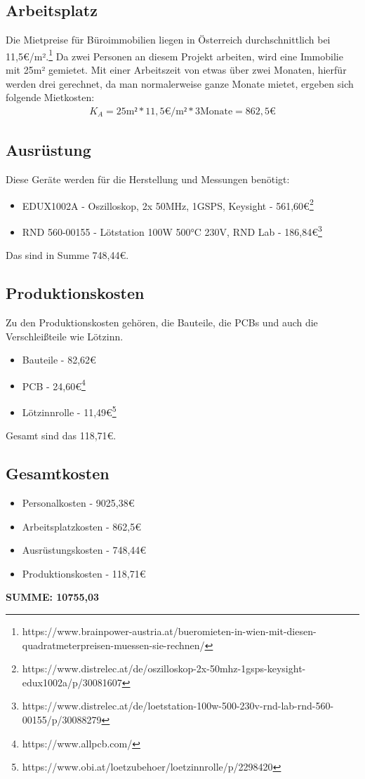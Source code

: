 \documentclass[paper=a4, 12pt]{scrreprt}
\begin{document}
		\subsection{Arbeitsplatz}\hfill \break
		Die Mietpreise für Büroimmobilien liegen in Österreich durchschnittlich bei 11,5€/m².\footnote{https://www.brainpower-austria.at/bueromieten-in-wien-mit-diesen-quadratmeterpreisen-muessen-sie-rechnen/} Da zwei Personen an diesem Projekt arbeiten, wird eine Immobilie mit 25m² gemietet. Mit einer Arbeitszeit von etwas über zwei Monaten, hierfür werden drei gerechnet, da man normalerweise ganze Monate mietet, ergeben sich folgende Mietkosten:
		\begin{align*} 
		K_{ A } = 25\text{m²} * 11,5\text{€/m²} * 3\text{Monate} = 862,5\text{€}
		\end{align*} 
		\subsection{Ausrüstung}\hfill \break
		Diese Geräte werden für die Herstellung und Messungen benötigt:
		\begin{itemize}
			\item EDUX1002A - Oszilloskop, 2x 50MHz, 1GSPS, Keysight - 561,60€\footnote{https://www.distrelec.at/de/oszilloskop-2x-50mhz-1gsps-keysight-edux1002a/p/30081607}
			\item RND 560-00155 - Lötstation 100W 500°C 230V, RND Lab - 186,84€\footnote{https://www.distrelec.at/de/loetstation-100w-500-230v-rnd-lab-rnd-560-00155/p/30088279}
		\end{itemize}
		Das sind in Summe 748,44€.
		\newpage
		
		\subsection{Produktionskosten}\hfill \break
		Zu den Produktionskosten gehören, die Bauteile, die PCBs und auch die Verschleißteile wie Lötzinn.
		\begin{itemize}
			\item Bauteile - 82,62€
			\item PCB - 24,60€\footnote{https://www.allpcb.com/}
			\item Lötzinnrolle - 11,49€\footnote{https://www.obi.at/loetzubehoer/loetzinnrolle/p/2298420}
		\end{itemize}
		Gesamt sind das 118,71€.
		
		\subsection{Gesamtkosten}\hfill \break
		\begin{itemize}
			\item Personalkosten - 9025,38€
			\item Arbeitsplatzkosten - 862,5€
			\item Ausrüstungskosten - 748,44€
			\item Produktionskosten - 118,71€
		\end{itemize}
		\textbf{SUMME: 10755,03}
		\newpage	
	
\end{document}
